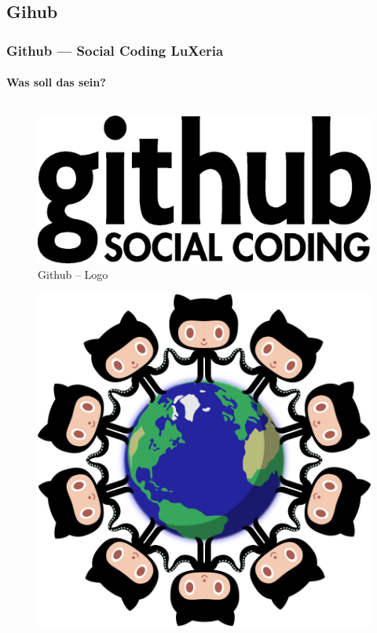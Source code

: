 \subsection{Gihub}
\begin{frame}
    \frametitle{Github --- Social Coding \hfill{} LuXeria}
    \framesubtitle{Was soll das sein?}
    \begin{columns}
        \begin{column}{5cm}
            \begin{figure}
                \includegraphics[scale=0.15]{github_logo.eps}
                \caption{Github -- Logo}
            \end{figure}
            \begin{figure}
                \includegraphics[scale=0.08]{github_network.jpg}

\end{figure}
\end{column}
\end{columns}
\end{frame}
